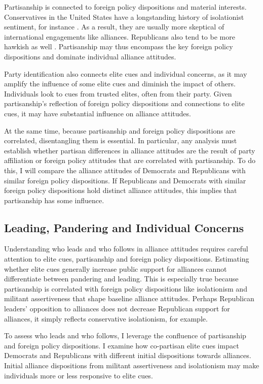\documentclass[12pt]{article}
\begin{document}
Partisanship is connected to foreign policy dispositions and material interests. 
Conservatives in the United States have a longstanding history of isolationist sentiment, for instance \citep{Kupchan2020}.
As a result, they are usually more skeptical of international engagements like alliances. 
Republicans also tend to be more hawkish as well \citep{Gries2014}. 
Partisanship may thus encompass the key foreign policy dispositions and dominate individual alliance attitudes. 


Party identification also connects elite cues and individual concerns, as it may amplify the influence of some elite cues and diminish the impact of others.
Individuals look to cues from trusted elites, often from their party. 
Given partisanship's reflection of foreign policy dispositions and connections to elite cues, it may have substantial influence on alliance attitudes. 


At the same time, because partisanship and foreign policy dispositions are correlated, disentangling them is essential. 
In particular, any analysis must establish whether partisan differences in alliance attitudes are the result of party affiliation or foreign policy attitudes that are correlated with partisanship. 
To do this, I will compare the alliance attitudes of Democrats and Republicans with similar foreign policy dispositions. 
If Republicans and Democrats with similar foreign policy dispositions hold distinct alliance attitudes, this implies that partisanship has some influence. 


\subsection{Leading, Pandering and Individual Concerns}


Understanding who leads and who follows in alliance attitudes requires careful attention to elite cues, partisanship and foreign policy dispositions. 
Estimating whether elite cues generally increase public support for alliances cannot differentiate between pandering and leading. 
This is especially true because partisanship is correlated with foreign policy dispositions like isolationism and militant assertiveness that shape baseline alliance attitudes. 
Perhaps Republican leaders' opposition to alliances does not decrease Republican support for alliances, it simply reflects conservative isolationism, for example. 


To assess who leads and who follows, I leverage the confluence of partisanship and foreign policy dispositions.
I examine how co-partisan elite cues impact Democrats and Republicans with different initial dispositions towards alliances.
Initial alliance dispositions from militant assertiveness and isolationism may make individuals more or less responsive to elite cues. 
\end{document}
